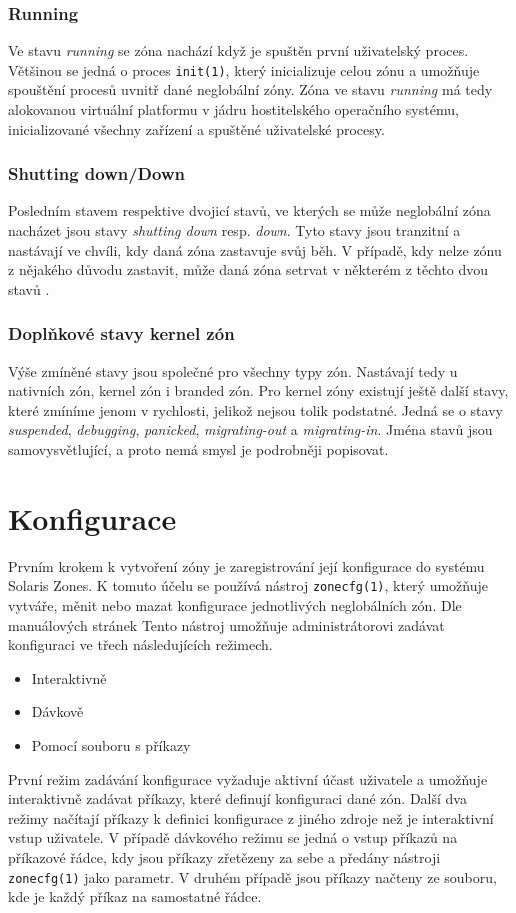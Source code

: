 \subsubsection{Running}
\label{chapter:zones:administration:states:running}
Ve stavu \textit{running} se zóna nachází když je spuštěn první uživatelský proces. Většinou se jedná o proces \verb|init(1)|,
který inicializuje celou zónu a umožňuje spouštění procesů uvnitř dané neglobální zóny. Zóna ve stavu \textit{running} má tedy
alokovanou virtuální platformu v jádru hostitelského operačního systému, inicializované všechny zařízení a spuštěné uživatelské
procesy.
\subsubsection{Shutting down/Down}
\label{chapter:zones:administration:states:down}
Posledním stavem respektive dvojicí stavů, ve kterých se může neglobální zóna nacházet jsou stavy \textit{shutting down} resp. 
\textit{down}. Tyto stavy jsou tranzitní a nastávají ve chvíli, kdy daná zóna zastavuje svůj běh. V případě, kdy nelze zónu
z nějakého důvodu zastavit, může daná zóna setrvat v některém z těchto dvou stavů \cite{oracle:solaris:zones:states}. 
\subsubsection{Doplňkové stavy kernel zón}
\label{chapter:zones:administration:states:kernel_zones}
Výše zmíněné stavy jsou společné pro všechny typy zón. Nastávají tedy u nativních zón, kernel zón i branded zón. Pro kernel
zóny existují ještě další stavy, které zmíníme jenom v rychlosti, jelikož nejsou tolik podstatné. Jedná se o stavy
\textit{suspended}, \textit{debugging}, \textit{panicked}, \textit{migrating-out} a \textit{migrating-in}. Jména stavů jsou
samovysvětlující, a proto nemá smysl je podrobněji popisovat.
\section{Konfigurace}
\label{chapter:zones:configuration}
Prvním krokem k vytvoření zóny je zaregistrování její konfigurace do systému Solaris Zones. K tomuto účelu se používá nástroj
\verb|zonecfg(1)|, který umožňuje vytváře, měnit nebo mazat konfigurace jednotlivých neglobálních zón. Dle manuálových stránek 
\cite{oracle:manpages:zonecfg} Tento nástroj umožňuje administrátorovi zadávat konfiguraci ve třech následujících režimech.
\begin{itemize}
 \item Interaktivně
 \item Dávkově
 \item Pomocí souboru s příkazy
\end{itemize}
První režim zadávání konfigurace vyžaduje aktivní účast uživatele a umožňuje interaktivně zadávat příkazy, které definují
konfiguraci dané zón. Další dva režimy načítají příkazy k definici konfigurace z jiného zdroje než je interaktivní vstup uživatele.
V případě dávkového režimu se jedná o vstup příkazů na příkazové řádce, kdy jsou příkazy zřetězeny za sebe a předány nástroji
\verb|zonecfg(1)| jako parametr. V druhém případě jsou příkazy načteny ze souboru, kde je každý příkaz na samostatné řádce.

